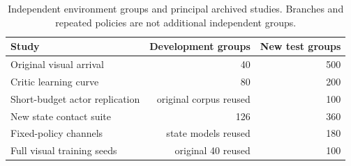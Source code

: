 \documentclass[10pt,a4paper]{article}
\begin{document}
\renewcommand{\thetable}{S\arabic{table}}
\setcounter{table}{9}
\begin{table}[H]\centering\small
\caption{Independent environment groups and principal archived studies. Branches and repeated policies are not additional independent groups.}
\begin{tabular}{lrr}\toprule Study & Development groups & New test groups\\\midrule
Original visual arrival & 40 & 500\\
Critic learning curve & 80 & 200\\
Short-budget actor replication & original corpus reused & 100\\
New state contact suite & 126 & 360\\
Fixed-policy channels & state models reused & 180\\
Full visual training seeds & original 40 reused & 100\\\bottomrule\end{tabular}
\end{table}
\end{document}
